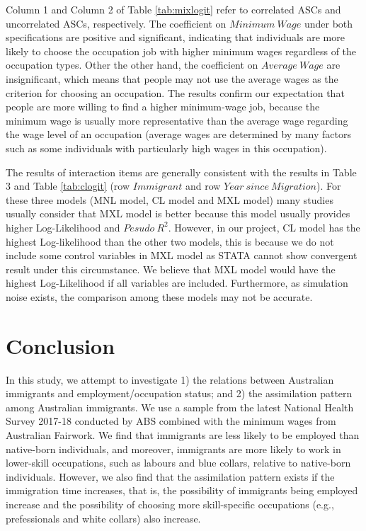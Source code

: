 Column 1 and Column 2 of Table \ref{tab:mixlogit} refer to correlated ASCs and uncorrelated ASCs, respectively. The coefficient on $\mathit{Minimum\ Wage}$ under both specifications are positive and significant, indicating that individuals are more likely to choose the occupation job with higher minimum wages regardless of the occupation types.
Other the other hand, the coefficient on $\mathit{Average\ Wage}$ are insignificant, which means that people may not use the average wages as the criterion for choosing an occupation.
The results confirm our expectation that people are more willing to find a higher minimum-wage job, because the minimum wage is usually more representative  than the average wage regarding the wage level of an occupation (average wages are determined by many factors such as some individuals with particularly high wages in this occupation).

The results of interaction items are generally consistent with the results in Table 3 and Table \ref{tab:clogit} (row $\mathit{Immigrant}$ and row $\mathit{Year\ since\ Migration}$).
For these three models (MNL model, CL model and MXL model) many studies usually consider that MXL model is better because this model usually provides higher Log-Likelihood and $\mathit{Pesudo\ R^2}$.
However, in our project, CL model has the highest Log-likelihood than the other two models, this is because we do not include some control variables in MXL model as STATA cannot show convergent result under this circumstance.
We believe that MXL model would have the highest Log-Likelihood if all variables are included.
Furthermore, as simulation noise exists, the comparison among these models may not be accurate.

\section{Conclusion}
\label{sec:Conclusion}

In this study, we attempt to investigate 1) the relations between Australian immigrants and employment/occupation status; and 2) the assimilation pattern among Australian immigrants.
We use a sample from the latest National Health Survey 2017-18 conducted by ABS combined with the minimum wages from Australian Fairwork.
We find that immigrants are less likely to be employed than native-born individuals, and moreover, immigrants are more likely to work in lower-skill occupations, such as labours and blue collars, relative to native-born individuals.
However, we also find that the assimilation pattern exists if the immigration time increases, that is, the possibility of immigrants being employed increase and the possibility of choosing more skill-specific occupations (e.g., prefessionals and white collars) also increase.

